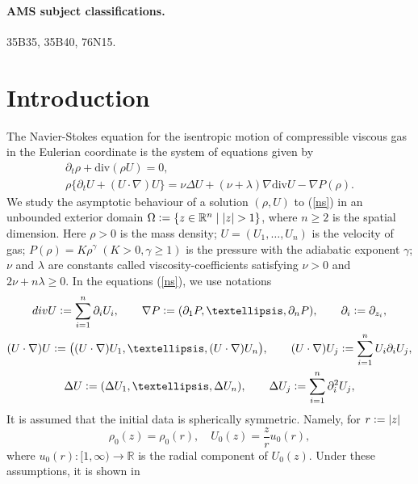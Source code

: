 \documentclass[a4paper,12pt,draft]{article}
\theoremstyle{remark}
\def\R{\mathbb{R}}
\def\d{\partial}
\begin{document}
\paragraph{AMS subject classifications.}
35B35, 35B40, 76N15.

{\hypersetup{linkcolor=blue}
	\tableofcontents
}


\section{Introduction}
 The
Navier-Stokes equation
for the isentropic motion
of  compressible viscous gas
in the Eulerian coordinate
 is  the system of equations given by
\begin{subequations}
\label{ns}
\begin{gather}
\d_t \rho  + \textrm{div} (\rho U) = 0, \label{ns1} \\
\rho \{ \d_t U + (U \cdot \nabla) U \} =
\nu \Delta U +(\nu + \lambda) \nabla \textrm{div} U
- \nabla P(\rho).
\label{ns2}
\end{gather}
\end{subequations}
We study the asymptotic behaviour of a solution
$(\rho, U)$ to (\ref{ns}) in an unbounded exterior domain %
$\Omega \vcentcolon= \{ z \in \R^n \; \vert \; |z| > 1 \}$, where $n\ge 2$ is the spatial dimension. Here $\rho>0$ is the mass density; $U=(U_1,\dots,U_n)$ is the velocity of gas; $P(\rho) = K\rho^\gamma \; (K>0, \gamma \ge 1)$ is the pressure
with the adiabatic exponent $\gamma$; $\nu$ and $\lambda$ are constants called viscosity-coefficients satisfying $\nu>0$ and $2\nu + n \lambda \ge 0$. In the equations (\ref{ns}), we use notations
\begin{gather*}
    \textrm{div} U \vcentcolon= \sum_{i=1}^n \d_i U_i, \qquad \nabla P \vcentcolon= ( \d_1 P, \dots, \d_n P ), \qquad \d_i \vcentcolon= \d_{z_i},\\
    (U \cdot \nabla) U \vcentcolon= \big((U \cdot \nabla) U_1, \dots, (U \cdot \nabla) U_n\big), \qquad (U \cdot \nabla) U_j \vcentcolon= \sum_{i=1}^n U_i \d_i U_j,\\
    \Delta U \vcentcolon= (\Delta U_1, \dots, \Delta U_n), \qquad \Delta U_j \vcentcolon= \sum_{i=1}^n \d_i^2 U_j,
\end{gather*}
It is assumed that the initial data is spherically symmetric. Namely, for $r \vcentcolon= |z|$
\begin{equation*}
\rho_0(z) = \rho_0(r), \quad U_0(z) = \dfrac{z}{r} u_0(r),
\end{equation*}
where $u_0(r):[1,\infty)\to \R$ is the radial component of $U_0(z)$. Under these assumptions, it is shown in
\end{document}
